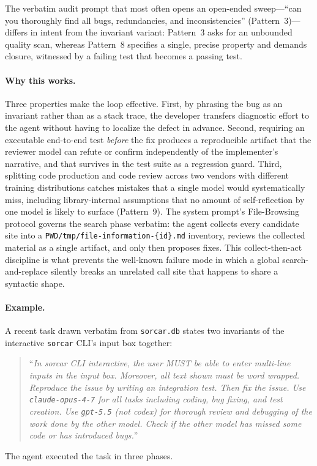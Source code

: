 \documentclass{article}
\begin{document}
\noindent The verbatim audit prompt that most often opens an
open-ended sweep---``can you thoroughly find all bugs, redundancies,
and inconsistencies'' (Pattern~3)---differs in intent from the
invariant variant: Pattern~3 asks for an unbounded quality scan,
whereas Pattern~8 specifies a single, precise property and demands
closure, witnessed by a failing test that becomes a passing test.

\paragraph{Why this works.}
Three properties make the loop effective.
First, by phrasing the bug as an invariant rather than as a stack
trace, the developer transfers diagnostic effort to the agent without
having to localize the defect in advance.
Second, requiring an executable end-to-end test \emph{before} the fix
produces a reproducible artifact that the reviewer model can refute
or confirm independently of the implementer's narrative, and that
survives in the test suite as a regression guard.
Third, splitting code production and code review across two vendors
with different training distributions catches mistakes that a single
model would systematically miss, including library-internal
assumptions that no amount of self-reflection by one model is likely
to surface (Pattern~9).
The system prompt's File-Browsing protocol governs the search phase
verbatim: the agent collects every candidate site into a
\texttt{PWD/tmp/file-information-\{id\}.md} inventory, reviews the
collected material as a single artifact, and only then proposes
fixes.
This collect-then-act discipline is what prevents the well-known
failure mode in which a global search-and-replace silently breaks an
unrelated call site that happens to share a syntactic shape.

\paragraph{Example.}
A recent task drawn verbatim from \texttt{sorcar.db} states two
invariants of the interactive \texttt{sorcar} CLI's input box
together:
\begin{quote}\small
``\emph{In sorcar CLI interactive, the user MUST be able to enter
multi-line inputs in the input box.  Moreover, all text shown must be
word wrapped.  Reproduce the issue by writing an integration test.
Then fix the issue.  Use \texttt{claude-opus-4-7} for all tasks
including coding, bug fixing, and test creation.  Use
\texttt{gpt-5.5} (not codex) for thorough review and debugging of the
work done by the other model.  Check if the other model has missed
some code or has introduced bugs.}''
\end{quote}
The agent executed the task in three phases.
\end{document}
